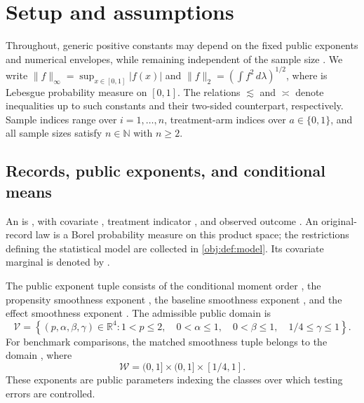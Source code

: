 \documentclass[11pt]{article}
\begin{document}
\section{Setup and assumptions}

Throughout, generic positive constants may depend on the fixed public exponents and numerical envelopes, while remaining independent of the sample size . We write \(\|f\|_\infty=\sup_{x\in[0,1]}|f(x)|\) and \(\|f\|_2=(\int f^2\,d\lambda)^{1/2}\), where  is Lebesgue probability measure on \([0,1]\). The relations \(\lesssim\) and \(\asymp\) denote inequalities up to such constants and their two-sided counterpart, respectively. Sample indices range over \(i=1,\ldots,n\), treatment-arm indices over \(a\in\{0,1\}\), and all sample sizes satisfy \(n\in\mathbb N\) with \(n\ge2\).

\subsection{Records, public exponents, and conditional means}

An  is , with covariate , treatment indicator , and observed outcome . An original-record law  is a Borel probability measure on this product space; the restrictions defining the statistical model are collected in \cref{obj:def:model}. Its covariate marginal is denoted by .

The public exponent tuple  consists of the conditional moment order , the propensity smoothness exponent , the baseline smoothness exponent , and the effect smoothness exponent . The admissible public domain  is
\[
\mathcal V
=
\left\{
(p,\alpha,\beta,\gamma)\in\mathbb R^4:
1<p\le2,\quad
0<\alpha\le1,\quad
0<\beta\le1,\quad
1/4\le\gamma\le1
\right\}.
\]
For benchmark comparisons, the matched smoothness tuple  belongs to the domain , where
\[
\mathcal W=(0,1]\times(0,1]\times[1/4,1].
\]
These exponents are public parameters indexing the classes over which testing errors are controlled.
\end{document}
